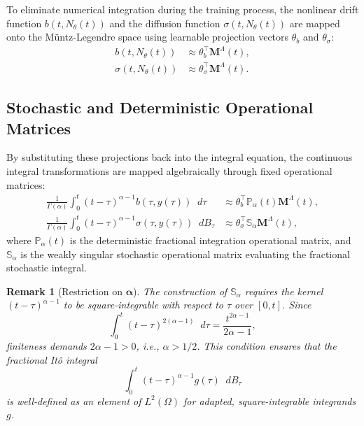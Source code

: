 \documentclass[11pt, a4paper]{article}
\theoremstyle{theoremstyle}
\theoremstyle{definitionstyle}
\newtheorem{remark}[theorem]{Remark}
\newcommand{\dd}{\mathop{}\!d}
\begin{document}
To eliminate numerical integration during the training process, the nonlinear drift function $b(t, N_\theta(t))$ and the diffusion function $\sigma(t, N_\theta(t))$ are mapped onto the M\"untz-Legendre space using learnable projection vectors $\theta_b$ and $\theta_\sigma$:
\begin{equation}
\begin{aligned}
    b(t, N_\theta(t)) &\approx \theta_b^\top \mathbf{M}^\Lambda(t), \\
    \sigma(t, N_\theta(t)) &\approx \theta_\sigma^\top \mathbf{M}^\Lambda(t).
\end{aligned}
\end{equation}

\subsection{Stochastic and Deterministic Operational Matrices}\label{sec:stoch_det_op}
By substituting these projections back into the integral equation, the continuous integral transformations are mapped algebraically through fixed operational matrices:
\begin{equation}
\begin{aligned}
    \frac{1}{\Gamma(\alpha)} \int_0^t (t-\tau)^{\alpha-1} b(\tau, y(\tau)) \dd{\tau} &\approx \theta_b^\top \mathbb P_\alpha(t) \mathbf{M}^\Lambda(t), \\
    \frac{1}{\Gamma(\alpha)} \int_0^t (t-\tau)^{\alpha-1} \sigma(\tau, y(\tau)) \dd{B_\tau} &\approx \theta_\sigma^\top \mathbb S_\alpha \mathbf{M}^\Lambda(t),
\end{aligned}
\end{equation}
where $\mathbb P_\alpha(t)$ is the deterministic fractional integration operational matrix, and $\mathbb{S}_\alpha$ is the weakly singular stochastic operational matrix evaluating the fractional stochastic integral.

\begin{remark}[Restriction on $\boldsymbol \alpha$]\label{rem:alpha}
    The construction of $\mathbb{S}_\alpha$ requires the kernel $(t-\tau)^{\alpha-1}$ to be square-integrable with respect to $\tau$ over $[0,t]$. Since
    \begin{equation} \int_0^t (t-\tau)^{2(\alpha-1)} \dd{\tau} = \frac{t^{2\alpha-1}}{2\alpha - 1}, \end{equation}
    finiteness demands $2\alpha - 1 > 0$, i.e., $\alpha > 1/2$. This condition ensures that the fractional It\^o integral
    \begin{equation} \int_0^t (t-\tau)^{\alpha-1} g(\tau) \dd{B_\tau} \end{equation}
    is well-defined as an element of $L^2(\Omega)$ for adapted, square-integrable integrands $g$.
\end{remark}
\end{document}
